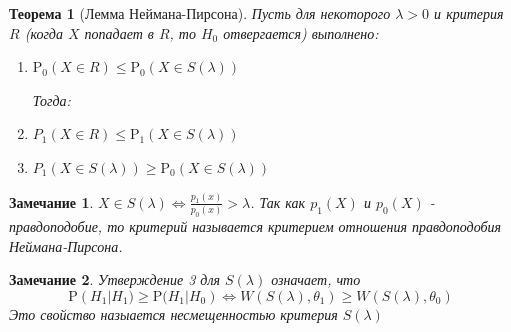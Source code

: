 \documentclass[12pt]{article}
\newtheorem{remark}{Замечание}
\theoremstyle{basic_theorem}
\newtheorem{theorem}{Теорема}
\theoremstyle{name_theorem}
\def\P{ \mathrm{P} }
\begin{document}
\begin{theorem}[Лемма Неймана-Пирсона]
    \label{th::lemma_N_P}
    Пусть для некоторого \(\lambda > 0\) и критерия \(R\)
    (когда \(X\) попадает в \(R\), то \(H_0\) отвергается)
    выполнено:
    \begin{enumerate}
        \item  \(\P_0(X\in R) \leq \P_0(X\in S(\lambda))\)

        Тогда:
        \item  \(P_1(X\in R) \leq \P_1(X\in S(\lambda))\)
        \item  \(P_1(X\in S(\lambda)) \geq \P_0(X\in S(\lambda))\)
    \end{enumerate}
\end{theorem}
\begin{remark}
    \(X\in S(\lambda) \Leftrightarrow \frac{p_1(x)}{p_0(x)} > \lambda\).
    Так как \(p_1(X)\) и \(p_0(X)\) - правдоподобие, то критерий
    называется критерием отношения правдоподобия Неймана-Пирсона.
\end{remark}
\begin{remark}
    Утверждение 3 для \(S(\lambda)\)
    означает, что
    \[\P(H_1 \left\lvert  H_1) \geq \P(H_1 \right\rvert H_0) \Leftrightarrow W(S(\lambda), \theta_1) \geq W(S(\lambda), \theta_0)\]
    Это свойство назыается несмещенностью критерия \(S(\lambda)\)
\end{remark}
\end{document}
